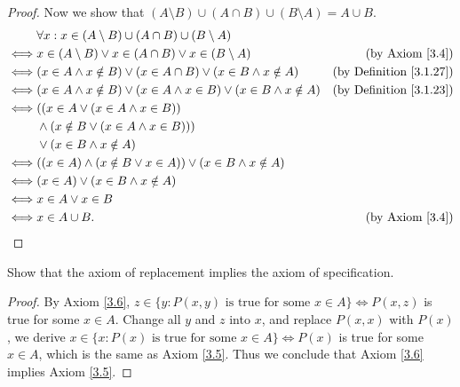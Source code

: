 \begin{proof}
    Now we show that \((A \setminus B) \cup (A \cap B) \cup (B \setminus A) = A \cup B\).
    \begin{align*}
             & \forall x : x \in (A \setminus B) \cup (A \cap B) \cup (B \setminus A)                                                        \\
        \iff & x \in (A \setminus B) \lor x \in (A \cap B) \lor x \in (B \setminus A)                  & \text{(by Axiom \ref{3.4})}         \\
        \iff & (x \in A \land x \notin B) \lor (x \in A \cap B) \lor (x \in B \land x \notin A)        & \text{(by Definition \ref{3.1.27})} \\
        \iff & (x \in A \land x \notin B) \lor (x \in A \land x \in B) \lor (x \in B \land x \notin A) & \text{(by Definition \ref{3.1.23})} \\
        \iff & ((x \in A \lor (x \in A \land x \in B))                                                                                       \\
             & \land (x \notin B \lor (x \in A \land x \in B)))                                                                              \\
             & \lor (x \in B \land x \notin A)                                                                                               \\
        \iff & ((x \in A) \land (x \notin B \lor x \in A)) \lor (x \in B \land x \notin A)                                                   \\
        \iff & (x \in A) \lor (x \in B \land x \notin A)                                                                                     \\
        \iff & x \in A \lor x \in B                                                                                                          \\
        \iff & x \in A \cup B.                                                                         & \text{(by Axiom \ref{3.4})}
    \end{align*}
\end{proof}

\begin{exercise}\label{ex 3.1.11}
    Show that the axiom of replacement implies the axiom of specification.
\end{exercise}

\begin{proof}
    By Axiom \ref{3.6}, \(z \in \{y : P(x, y) \text{ is true for some } x \in A\} \iff P(x, z)\) is true for some \(x \in A\).
    Change all \(y\) and \(z\) into \(x\), and replace \(P(x, x)\) with \(P(x)\), we derive \(x \in \{x : P(x) \text{ is true for some } x \in A\} \iff P(x)\) is true for some \(x \in A\), which is the same as Axiom \ref{3.5}.
    Thus we conclude that Axiom \ref{3.6} implies Axiom \ref{3.5}.
\end{proof}